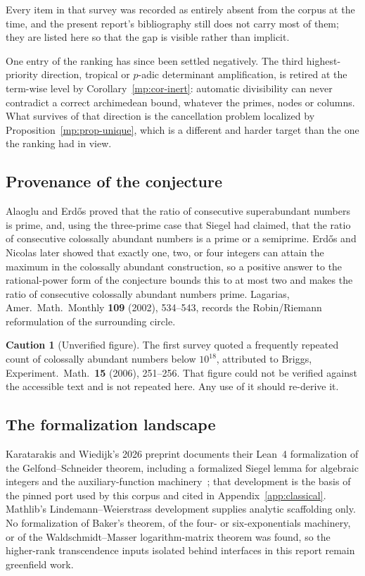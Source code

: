 \documentclass[11pt,oneside]{article}
\theoremstyle{definition}
\newtheorem{warning}[theorem]{Caution}
\theoremstyle{remark}
\begin{document}
Every item in that survey was recorded as entirely absent from the corpus at the time, and the
present report's bibliography still does not carry most of them; they are listed here so that
the gap is visible rather than implicit.

One entry of the ranking has since been settled negatively.  The third highest-priority
direction, tropical or $p$-adic determinant amplification, is retired at the term-wise level by
Corollary~\ref{mp:cor-inert}: automatic divisibility can never contradict a correct archimedean
bound, whatever the primes, nodes or columns.  What survives of that direction is the
cancellation problem localized by Proposition~\ref{mp:prop-unique}, which is a different and
harder target than the one the ranking had in view.

\subsection{Provenance of the conjecture}

Alaoglu and Erd\H{o}s proved that the ratio of consecutive superabundant numbers is prime, and,
using the three-prime case that Siegel had claimed, that the ratio of consecutive colossally
abundant numbers is a prime or a semiprime.  Erd\H{o}s and Nicolas later showed that exactly
one, two, or four integers can attain the maximum in the colossally abundant construction, so a
positive answer to the rational-power form of the conjecture bounds this to at most two and
makes the ratio of consecutive colossally abundant numbers prime.  Lagarias, Amer.\ Math.\
Monthly \textbf{109} (2002), 534--543, records the Robin/Riemann reformulation of the
surrounding circle.

\begin{warning}[Unverified figure]
The first survey quoted a frequently repeated count of colossally abundant numbers below
$10^{18}$, attributed to Briggs, Experiment.\ Math.\ \textbf{15} (2006), 251--256.  That figure
could not be verified against the accessible text and is not repeated here.  Any use of it
should re-derive it.
\end{warning}

\subsection{The formalization landscape}

Karatarakis and Wiedijk's 2026 preprint documents their Lean~4 formalization of the
Gelfond--Schneider theorem, including a formalized Siegel lemma for algebraic integers and the
auxiliary-function machinery~\cite{KaratarakisWiedijk2026}; that development is the basis of
the pinned port used by this corpus and cited in Appendix~\ref{app:classical}.  Mathlib's
Lindemann--Weierstrass development supplies analytic scaffolding only.  No formalization of
Baker's theorem, of the four- or six-exponentials machinery, or of the
Waldschmidt--Masser logarithm-matrix theorem was found, so the higher-rank transcendence inputs
isolated behind interfaces in this report remain greenfield work.
\end{document}

